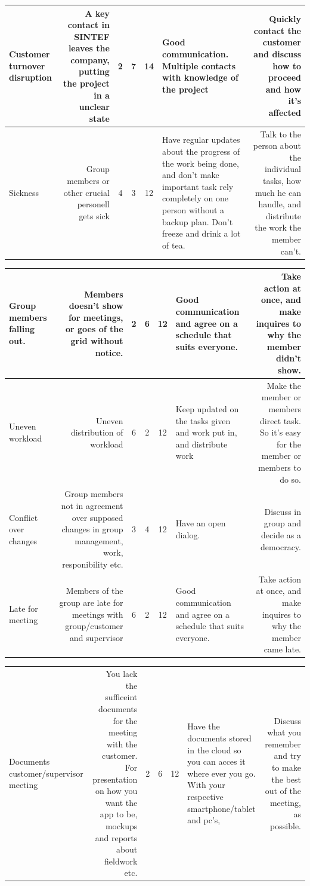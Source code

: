 \documentclass[12pt,a4paper,titlepage]{article}
\begin{document}
\begin{center}
\begin{tabulary}{\textwidth}{LRCCCLR}
\hline
Customer turnover disruption & A key contact in SINTEF leaves the company, putting the project in a unclear state & 2 & 7 & 14 & Good communication. Multiple contacts with knowledge of the project & Quickly contact the customer and discuss how to proceed and how it's affected\\ 
\hline
Sickness & Group members or other crucial personell gets sick & 4 & 3 & 12 & Have regular updates about the progress of the work being done, and don't make important task rely completely on one person without a backup plan. Don't freeze and drink a lot of tea. & Talk to the person about the individual tasks, how much he can handle, and distribute the work the member can't.\\ 
\hline
						\end{tabulary}
						\begin{tabulary}{\textwidth}{LRCCCLR} \toprule
Group members falling out. & Members doesn't show for meetings, or goes of the grid without notice. & 2 & 6 & 12 & Good communication and agree on a schedule that suits everyone. & Take action at once, and make inquires to why the member didn't show.\\ 
\hline
Uneven workload & Uneven distribution of workload & 6 & 2 & 12 & Keep updated on the tasks given and work put in, and distribute work  & Make the member or members direct task. So it's easy for the member or members to do so. \\ 
\hline
Conflict over changes & Group members not in agreement over supposed changes in group management, work, responibility etc. & 3 & 4 & 12 & Have an open dialog. & Discuss in group and decide as a democracy.\\ 
\hline
Late for meeting & Members of the group are late for meetings with group/customer and supervisor & 6 & 2 & 12 & Good communication and agree on a schedule that suits everyone. & Take action at once, and make inquires to why the member came late.\\ 
\hline 
						\end{tabulary}
						\begin{tabulary}{\textwidth}{LRCCCLR} \toprule
Documents customer/supervisor meeting & You lack the sufficeint documents for the meeting with the customer. For presentation on how you want the app to be, mockups and reports about fieldwork etc. & 2 & 6 & 12 & Have the documents stored in the cloud so  you can acces it where ever you go. With your respective smartphone/tablet and pc's, & Discuss what you remember and try to make the best out of the meeting, as possible.\\ 

\end{tabulary}
\end{center}
\end{document}
